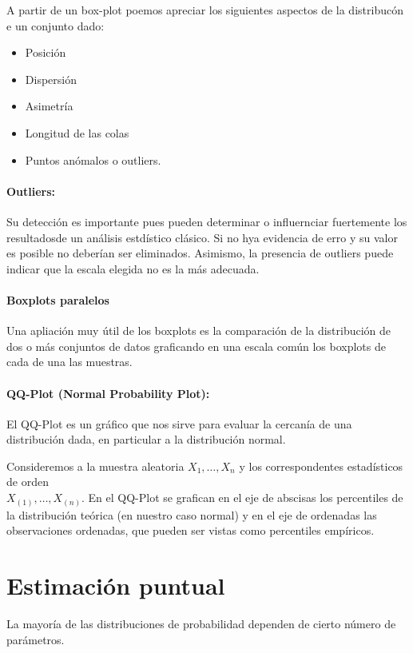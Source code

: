 A partir de un box-plot poemos apreciar los siguientes aspectos de la distribucón e un conjunto dado:
\begin{itemize}
	\item Posición
	\item Dispersión
	\item Asimetría
	\item Longitud de las colas
	\item Puntos anómalos o outliers.
\end{itemize}

\paragraph{Outliers:} Su detección es importante pues pueden determinar o influernciar fuertemente los resultadosde un análisis estdístico clásico. Si no hya evidencia de erro y su valor es posible no deberían ser eliminados. Asimismo, la presencia de outliers puede indicar que la escala elegida no es la más adecuada.

\paragraph{Boxplots paralelos}
Una apliación muy útil de los boxplots es la comparación de la distribución de dos o más conjuntos de datos graficando en una escala común los boxplots de cada de una las muestras.

\paragraph{QQ-Plot (Normal Probability Plot):} El QQ-Plot es un gráfico que nos sirve para evaluar la cercanía de una distribución dada, en particular a la distribución normal.

Consideremos a la muestra aleatoria $X_1,\dots,X_n$ y los correspondentes estadísticos de orden \\ $X_{(1)},\dots,X_(n)$. En el QQ-Plot se grafican en el eje de abscisas los percentiles de la distribución teórica (en nuestro caso normal) y en el eje de ordenadas las observaciones ordenadas, que pueden ser vistas como percentiles empíricos.

\section{Estimación puntual}
La mayoría de las distribuciones de probabilidad dependen de cierto número de parámetros.


